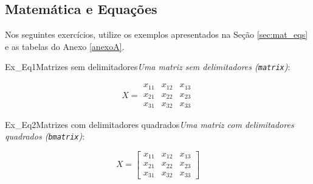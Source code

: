 \subsection*{Matemática e Equações}
\label{sec:exec_mat_eqs}

Nos seguintes exercícios, utilize os exemplos apresentados na Seção \ref{sec:mat_eqs} e as tabelas do Anexo \ref{anexoA}.

\begin{texercise}{Ex_Eq1}{Matrizes sem delimitadores}\textit{Uma matriz sem delimitadores ({\tt matrix})}:\par\smallskip%
\begin{tcboutputlisting}
    \begin{center}
        \begin{equation*}
            X = 
            \begin{matrix} 
                x_{11} & x_{12} & x_{13} \\ 
                x_{21} & x_{22} & x_{23} \\ 
                x_{31} & x_{32} & x_{33} 
            \end{matrix}
        \end{equation*}
    \end{center}
\end{tcboutputlisting}
\tcbuselistingtext%
\end{texercise}

\begin{texercise}{Ex_Eq2}{Matrizes com delimitadores quadrados}\textit{Uma matriz com delimitadores quadrados ({\tt bmatrix})}:\par\smallskip%
\begin{tcboutputlisting}
    \begin{center}
        \begin{equation*}
            X =
            \begin{bmatrix} 
                x_{11} & x_{12} & x_{13} \\ 
                x_{21} & x_{22} & x_{23} \\ 
                x_{31} & x_{32} & x_{33} 
            \end{bmatrix}
        \end{equation*}
    \end{center}
\end{tcboutputlisting}
\tcbuselistingtext%
\end{texercise}

